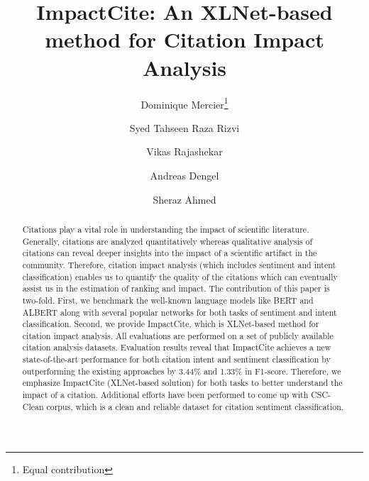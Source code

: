 \documentclass[runningheads]{llncs}
\newcommand{\repeatthanks}{\textsuperscript{\thefootnote}}
\begin{document}
\title{ImpactCite: An XLNet-based method for Citation Impact Analysis}


\author{Dominique Mercier\thanks{Equal contribution} \and
Syed Tahseen Raza Rizvi\repeatthanks{} \and
Vikas Rajashekar \and
Andreas Dengel \and
Sheraz Ahmed}
\maketitle              \begin{abstract}

Citations play a vital role in understanding the impact of scientific literature. Generally, citations are analyzed quantitatively whereas qualitative analysis of citations can reveal deeper insights into the impact of a scientific artifact in the community. Therefore, citation impact analysis (which includes sentiment and intent classification) enables us to quantify the quality of the citations which can eventually assist us in the estimation of ranking and impact. The contribution of this paper is two-fold. First, we benchmark the well-known language models like BERT and ALBERT along with several popular networks for both tasks of sentiment and intent classification. Second, we provide ImpactCite, which is XLNet-based method for citation impact analysis. All evaluations are performed on a set of publicly available citation analysis datasets. Evaluation results reveal that ImpactCite achieves a new state-of-the-art performance for both citation intent and sentiment classification by outperforming the existing approaches by 3.44\% and 1.33\% in F1-score. Therefore, we emphasize ImpactCite (XLNet-based solution) for both tasks to better understand the impact of a citation. Additional efforts have been performed to come up with CSC-Clean corpus, which is a clean and reliable dataset for citation sentiment classification.



\end{abstract}
\end{document}
